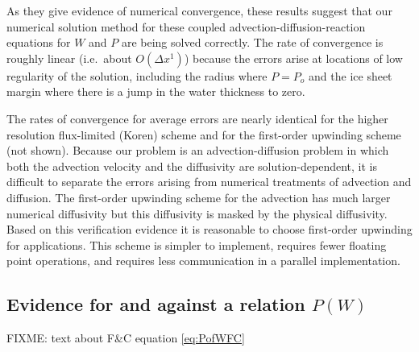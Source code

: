 \documentclass[gmd]{copernicus}   %
\begin{document}
As they give evidence of numerical convergence, these results suggest that our numerical solution method for these coupled advection-diffusion-reaction equations for $W$ and $P$ are being solved correctly.  The rate of convergence is roughly linear (i.e.~about $O(\Delta x^1)$) because the errors arise at locations of low regularity of the solution, including the radius where $P=P_o$ and the ice sheet margin where there is a jump in the water thickness to zero.

The rates of convergence for average errors are nearly identical for the higher resolution flux-limited (Koren) scheme and for the first-order upwinding scheme (not shown).  Because our problem is an advection-diffusion problem in which both the advection velocity and the diffusivity are solution-dependent, it is difficult to separate the errors arising from numerical treatments of advection and diffusion.  The first-order upwinding scheme for the advection has much larger numerical diffusivity but this diffusivity is masked by the physical diffusivity.  Based on this verification evidence it is reasonable to choose first-order upwinding for applications.  This scheme is simpler to implement, requires fewer floating point operations, and requires less communication in a parallel implementation.


\subsection{Evidence for and against a relation $P(W)$}

FIXME:  text about F\&C equation \eqref{eq:PofWFC}
\end{document}
